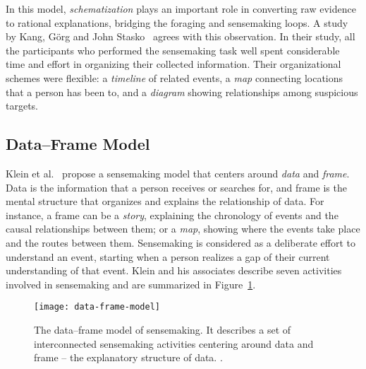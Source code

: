In this model, \emph{schematization} plays an important role in converting raw evidence to rational explanations, bridging the foraging and sensemaking loops. A study by Kang, Görg and John Stasko~\cite{Kang2011} agrees with this observation. In their study, all the participants who performed the sensemaking task well spent considerable time and effort in organizing their collected information. Their organizational schemes were flexible: a \emph{timeline} of related events, a \emph{map} connecting locations that a person has been to, and a \emph{diagram} showing relationships among suspicious targets.

\subsection{Data--Frame Model}
\label{sub:rv-dfm}
Klein et al.~\cite{Klein2003} propose a sensemaking model that centers around \emph{data} and \emph{frame}. Data is the information that a person receives or searches for, and frame is the mental structure that organizes and explains the relationship of data. For instance, a frame can be a \emph{story}, explaining the chronology of events and the causal relationships between
them; or a \emph{map}, showing where the events take place and the routes between them. Sensemaking is considered as a deliberate effort to understand an event, starting when a person realizes a gap of their current understanding of that event. Klein and his associates describe seven activities involved in sensemaking and are summarized in Figure~\ref{fig:data-frame-model}.

\begin{figure}[!htb]
	\centering
	\texttt{[image: data-frame-model]}
	\caption{The data--frame model of sensemaking. It describes a set of interconnected sensemaking activities centering around data and frame -- the explanatory structure of data. .}
	\label{fig:data-frame-model}
\end{figure}


